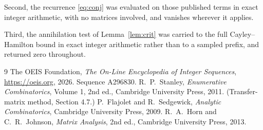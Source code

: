 \documentclass[11pt,a4paper]{article}
\theoremstyle{plain}
\theoremstyle{definition}
\begin{document}
Second, the recurrence \eqref{eq:conj} was evaluated on those published terms in exact
integer arithmetic, with no matrices involved, and vanishes wherever it applies.

Third, the annihilation test of Lemma~\ref{lem:crit} was carried to the full
Cayley--Hamilton bound in exact integer arithmetic rather than to a sampled prefix, and
returned zero throughout.

\begin{thebibliography}{9}
 The OEIS Foundation, \emph{The On-Line Encyclopedia of Integer
Sequences}, \url{https://oeis.org}, 2026. Sequence A296830.
 R.~P.~Stanley, \emph{Enumerative Combinatorics}, Volume 1, 2nd ed.,
Cambridge University Press, 2011. (Transfer-matrix method, Section 4.7.)
 P.~Flajolet and R.~Sedgewick, \emph{Analytic Combinatorics}, Cambridge
University Press, 2009.
 R.~A.~Horn and C.~R.~Johnson, \emph{Matrix Analysis}, 2nd ed., Cambridge
University Press, 2013.
\end{thebibliography}
\end{document}
